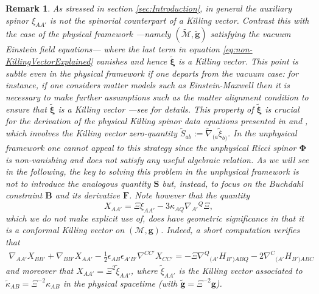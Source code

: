 \documentclass[10pt,a4paper]{article}
\theoremstyle{plain}
\newtheorem{remark}{Remark}
\def\bmg{{\bm g}}
\def\bmB{{\bm B}}
\def\bmF{{\bm F}}
\def\bmS{{\bm S}}
\begin{document}
\begin{remark}
  \emph{ As stressed in section \ref{sec:Introduction}, in general
  the auxiliary spinor $\xi_{AA'}$ is not the spinorial counterpart of
  a Killing vector. Contrast this with the case of the physical
  framework ---namely $(\tilde{\mathcal{M}},\tilde{\bmg})$ satisfying
  the vacuum Einstein field equations--- where the last term in
  equation \eqref{eq:non-KillingVectorExplained} vanishes and hence
  $\tilde{\bm\xi}$ is a Killing vector. This point is subtle even
  in the physical framework if one departs from the vacuum case: for instance, if one considers matter models such as
  Einstein-Maxwell then it is necessary to make further assumptions
  such as the \emph{matter alignment condition} to ensure that $\tilde{\bm\xi}$ is a
  Killing vector ---see \cite{ValCol16} for details. This property of
  $\tilde{\bm\xi}$ is crucial for the derivation of the physical
  Killing spinor data equations presented in \cite{GarVal08c} and
  \cite{ValCol16}, which involves the Killing vector zero-quantity $\tilde{S}_{ab}:=
  \tilde{\nabla}_{(a}\tilde{\xi}_{b)}$. 
  In the unphysical
  framework one cannot appeal to this strategy since the unphysical
  Ricci spinor $\bm\Phi$ is non-vanishing and does not satisfy any
  useful algebraic relation.
  As we will see in
  the following, the key to solving this problem in the unphysical
  framework is not to introduce the analogous quantity $\bmS$ 
  but, instead, to
  focus on the Buchdahl constraint $\bmB$ and its derivative $\bmF$. Note however that the quantity 
  \begin{equation}\label{eq:conformalKillingVector}
X_{AA'}=\Xi \xi_{AA'} - 3 \kappa_{AQ}\nabla_{A'}{}^{Q}\Xi,
\end{equation}
which we do not make explicit use of, does have geometric significance in that it is a conformal Killing vector on $(\mathcal{M},\bmg)$. Indeed, a short computation verifies that
\begin{multline}\label{conformalKillingvector}
  \nabla_{AA'}X_{BB'}+\nabla_{BB'}X_{AA'}-\tfrac{1}{2}\epsilon_{AB}\epsilon_{A'B'}\nabla^{CC'}X_{CC'}
  =-\Xi \nabla^Q{}_{(A'}H_{B')ABQ} - 2\nabla^C{}_{(A'}H_{B')ABC}
\end{multline}
and moreover that $X_{AA'}=\Xi^2 \tilde{\xi}_{AA'}$, where $\tilde{\xi}_{AA'}$ is the Killing vector associated to $\tilde{\kappa}_{AB}=\Xi^{-2}\kappa_{AB}$ in the physical spacetime (with $\tilde{\bmg}=\Xi^{-2}\bmg$). 
  }
\end{remark}
\end{document}
